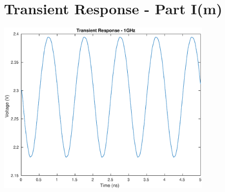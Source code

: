 \documentclass[12pt,a4paper]{article}
\begin{document}
\section{Transient Response - Part I(m)}

{\centering
	\includegraphics[width=0.8\textwidth]{plots/part_m.eps}
\par}

\pagebreak
\end{document}

